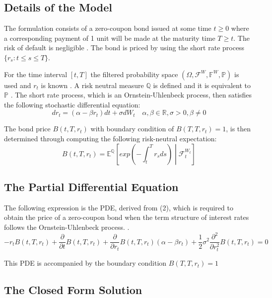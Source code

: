 \documentclass[12pt,a4paper]{article}
\begin{document}
\subsection{Details of the Model}
\label{subsec: Details}
The formulation consists of a zero-coupon bond issued at some time $t \geq 0$ where a corresponding payment of 1 unit will be made at the maturity time $T \geq t$. The risk of default is negligible \citep{shreve2004stochastic}. The bond is priced by using the short rate process $\{r_{s}:t \leq s \leq T\}$.

For the time interval $[t,T]$ the filtered probability space $(\Omega, \mathcal{F}^W,\mathbb{F}^W,\mathbb{P})$ is used and $r_t$ is known \citep{mamon2004three}. A risk neutral measure $\mathbb{Q}$ is defined and it is equivalent to $\mathbb{P}$ \citep{shreve2004stochastic}. The short rate process, which is an Ornstein-Uhlenbeck process, then satisfies the following stochastic differential equation: 
\begin{equation}
dr_{t} = (\alpha-\beta r_{t})dt + \sigma dW_{t} \quad \alpha, \beta \in \mathbb{R}, \sigma>0, \beta \neq 0
\end{equation}


The bond price $B(t,T,r_t)$ with boundary condition of $B(T,T,r_t) = 1$, is then determined through computing the following risk-neutral expectation:
\begin{equation}
B(t,T,r_t) = \mathbb{E}^{\mathbb{Q}}\left[exp\left(-\int_{t}^{T}r_{s} ds\right)\middle\vert\mathcal{F}_{t}^{W_{t}}\right]
\end{equation}


\subsection{The Partial Differential Equation}
\label{subsec: PDE}
The following expression is the PDE, derived from (2), which is required to obtain the price of a zero-coupon bond when the term structure of interest rates follows the Ornstein-Uhlenbeck process. .
$$\boxed{-r_t B(t,T,r_t) + \frac{\partial}{\partial t} B(t,T,r_t) + \frac{\partial}{\partial r_t}B(t,T,r_t)(\alpha - \beta r_t) +\frac{1}{2} \sigma^2 \frac{\partial^2}{\partial r_t^2} B(t,T,r_t) = 0 }$$

\noindent This PDE is accompanied by the boundary condition $B(T,T,r_t) = 1$
\subsection{The Closed Form Solution}
\label{subsec: Closed Form}
\end{document}
